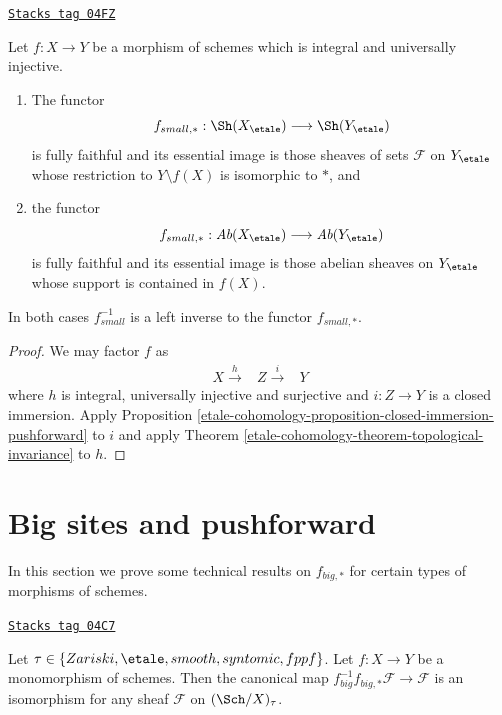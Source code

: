 \begin{proposition}
\label{etale-cohomology-proposition-integral-universally-injective-pushforward}
\href{https://stacks.math.columbia.edu/tag/04FZ}{\texttt{Stacks tag 04FZ}}

Let $f : X \to Y$ be a morphism of schemes which is integral
and universally injective.
\begin{enumerate}
\item The functor
$$
f_{small, *} :
\Sh(X_\etale)
\longrightarrow
\Sh(Y_\etale)
$$
is fully faithful and its essential image is those sheaves of sets
$\mathcal{F}$ on $Y_\etale$ whose restriction to $Y \setminus f(X)$ is
isomorphic to $*$, and
\item the functor
$$
f_{small, *} :
\textit{Ab}(X_\etale)
\longrightarrow
\textit{Ab}(Y_\etale)
$$
is fully faithful and its essential image is those abelian sheaves on
$Y_\etale$ whose support is contained in $f(X)$.
\end{enumerate}
In both cases $f_{small}^{-1}$ is a left inverse to the functor
$f_{small, *}$.
\end{proposition}

\begin{proof}
We may factor $f$ as
$$
\begin{array}{ccc}X \overset{h}{\longrightarrow} & Z \overset{i}{\longrightarrow} & Y\end{array}
$$
where $h$ is integral, universally injective and surjective
and $i : Z \to Y$ is a closed immersion.
Apply
Proposition \ref{etale-cohomology-proposition-closed-immersion-pushforward}
to $i$ and apply
Theorem \ref{etale-cohomology-theorem-topological-invariance}
to $h$.
\end{proof}

\section{Big sites and pushforward}
\label{etale-cohomology-section-big}
In this section we prove some technical results on $f_{big, *}$ for
certain types of morphisms of schemes.

\begin{lemma}
\label{etale-cohomology-lemma-monomorphism-big-push-pull}
\href{https://stacks.math.columbia.edu/tag/04C7}{\texttt{Stacks tag 04C7}}

Let $\tau \in \{Zariski, \etale, smooth, syntomic, fppf\}$.
Let $f : X \to Y$ be a monomorphism of schemes.
Then the canonical map
$f_{big}^{-1}f_{big, *}\mathcal{F} \to \mathcal{F}$
is an isomorphism for any sheaf $\mathcal{F}$ on
$(\Sch/X)_\tau$.
\end{lemma}

